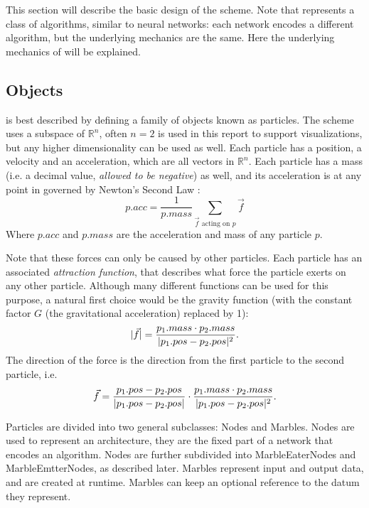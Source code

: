 This section will describe the basic design of the \nenwin scheme. Note that \nenwin represents a class of algorithms, similar to neural networks: each network encodes a different algorithm, but the underlying mechanics are the same. Here the underlying mechanics of \nenwin will be explained.

\subsection{Objects}
\nenwin is best described by defining a family of objects known as particles. The scheme uses a subspace of $\mathbb{R}^n$, often $n=2$ is used in this report to support visualizations, but any higher dimensionality can be used as well. Each particle has a position, a velocity and an acceleration, which are all vectors in $\mathbb{R}^n$. Each particle has a mass (i.e. a decimal value, \textit{allowed to be negative}) as well, and its acceleration is at any point in governed by Newton's Second Law \cite{principia}:
\begin{equation}
    p.acc = \frac{1}{p.mass} \sum_{\vec{f} \text{ acting on } p}\vec{f}
\end{equation}
Where $p.acc$ and $p.mass$ are the acceleration and mass of any particle $p$.

Note that these forces can only be caused by other particles. Each particle has an associated \textit{attraction function}, that describes what force the particle exerts on any other particle. Although many different functions can be used for this purpose, a natural first choice would be the gravity function (with the constant factor $G$ (the gravitational acceleration) replaced by 1):
\begin{equation}
    \lvert \vec{f} \rvert = \frac{p_1.mass \cdot p_2.mass}{\lvert p_1.pos - p_2.pos \rvert^2}. \label{eq:newton_grav_force}
\end{equation}
The direction of the force is the direction from the first particle to the second particle, i.e.
\begin{equation}
    \vec{f} = \frac{p_1.pos - p_2.pos}{\lvert p_1.pos - p_2.pos \rvert} \cdot\frac{p_1.mass \cdot p_2.mass}{\lvert p_1.pos - p_2.pos \rvert^2}. \label{eq:newton_grav_force}
\end{equation}

Particles are divided into two general subclasses: Nodes and Marbles. Nodes are used to represent an architecture, they are the fixed part of a \nenwin network that encodes an algorithm. Nodes are further subdivided into MarbleEaterNodes and MarbleEmtterNodes, as described later. Marbles represent input and output data, and are created at runtime. Marbles can keep an optional reference to the datum they represent.

